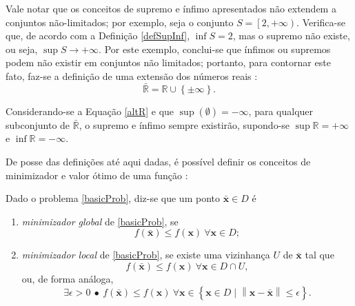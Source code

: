 Vale notar que os conceitos de supremo e \'{i}nfimo apresentados n\~{a}o extendem a conjuntos n\~{a}o-limitados; por exemplo, seja o conjunto $S = \left[ 2,+\infty \right)$. Verifica-se que, de acordo com a Defini\c{c}\~{a}o \ref{defSupInf}, $\inf S = 2$, mas o supremo n\~{a}o existe, ou seja, $\sup S \to +\infty$. Por este exemplo, conclui-se que \'{i}nfimos ou supremos podem n\~{a}o existir em conjuntos n\~{a}o limitados; portanto, para contornar este fato, faz-se a defini\c{c}\~{a}o de uma extens\~{a}o dos n\'{u}meros reais \cite{yang}: 
\begin{equation}
\label{altR}
\bar{\mathbb{R}} = \mathbb{R} \cup \left\lbrace \pm \infty \right\rbrace.
\end{equation}

Considerando-se a Equa\c{c}\~{a}o \eqref{altR} e que $\sup(\emptyset) = -\infty$, para qualquer subconjunto de $\bar{\mathbb{R}}$, o supremo e \'{i}nfimo sempre existir\~{a}o, supondo-se $\sup \mathbb{R} = +\infty$ e $\inf \mathbb{R} = -\infty$.

De posse das defini\c{c}\~{o}es at\'{e} aqui dadas, \'{e} poss\'{i}vel definir os conceitos de minimizador e valor \'{o}timo de uma fun\c{c}\~{a}o \cite{izmailov}:

\begin{definition} 
Dado o problema \eqref{basicProb}, diz-se que um ponto $\bar{\mathbf{x}} \in D$ \'{e}
\begin{enumerate}[label=(\alph*)]
\item \textit{minimizador global} de \eqref{basicProb}, se
\begin{equation}
\label{globalMin}
f(\bar{\mathbf{x}}) \le f(\mathbf{x}) ~ \forall \mathbf{x} \in D;
\end{equation}
\item \textit{minimizador local} de \eqref{basicProb}, se existe uma vizinhan\c{c}a $U$ de $\bar{\mathbf{x}}$ tal que
\begin{equation}
\label{localMin}
f(\bar{\mathbf{x}}) \le f(\mathbf{x}) ~ \forall \mathbf{x} \in D \cap U,
\end{equation} ou, de forma an\'{a}loga,
\begin{equation}
\exists \epsilon > 0 ~ \bullet ~ f(\bar{\mathbf{x}}) \le f(\mathbf{x}) ~ \forall \mathbf{x} \in \left\lbrace \mathbf{x} \in D \mid \left\|\mathbf{x} - \bar{\mathbf{x}} \right\| \le \epsilon \right\rbrace.
\end{equation}
\end{enumerate}
\end{definition} 

